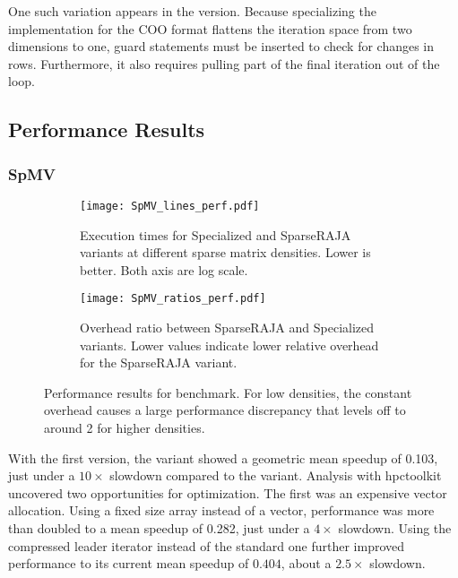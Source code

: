 One such variation appears in the \specialized{} version. 
Because specializing the implementation for the COO format flattens the iteration space from two dimensions to one, guard statements must be inserted to check for changes in rows. 
Furthermore, it also requires pulling part of the final iteration out of the loop.

\subsection{Performance Results}

\subsubsection{SpMV}
\begin{figure}
  \begin{subfigure}{0.49\columnwidth}
    \texttt{[image: SpMV\_lines\_perf.pdf]}
    \caption{Execution times for Specialized and SparseRAJA variants at different sparse matrix densities. Lower is better. Both axis are log scale.}\label{SpMVExecTime}
  \end{subfigure}
  \hspace{0.02\columnwidth}
  \begin{subfigure}{0.49\columnwidth}
    \texttt{[image: SpMV\_ratios\_perf.pdf]}
    \caption{Overhead ratio between SparseRAJA and Specialized variants. Lower values indicate lower relative overhead for the SparseRAJA variant.}\label{SpMVRatios}
  \end{subfigure}
  \caption{Performance results for \SpMV{} benchmark. For low densities, the constant overhead causes a large performance discrepancy that levels off to around 2 for higher densities.}\label{SpMVPerformance}
\end{figure}

With the first version, the \sparseraja{} variant showed a geometric mean speedup of 0.103, just under a $10\times$ slowdown compared to the \specialized{} variant.
Analysis with hpctoolkit uncovered two opportunities for optimization.
The first was an expensive vector allocation. 
Using a fixed size array instead of a vector, performance was more than doubled to a mean speedup of 0.282, just under a $4\times$ slowdown.
Using the compressed leader iterator instead of the standard one further improved performance to its current mean speedup of $0.404$, about a $2.5\times$ slowdown.




